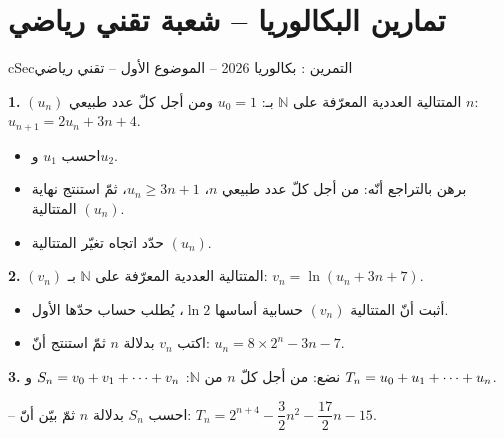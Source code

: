 \documentclass[12pt,a4paper]{article}
\newenvironment{BOX}[2]{\begin{otherlanguage}{english}\begin{arbox}{#1}{#2}}{\end{arbox}\end{otherlanguage}}
\newcounter{exo}
\newenvironment{tamrin}[1]{\stepcounter{exo}\begin{BOX}{cSec}{التمرين \theexo: #1}}{\end{BOX}}
\renewcommand{\cdots}{\mathinner{\cdotp\cdotp\cdotp}}
\newcommand{\N}{\mathbb{N}}
\newenvironment{sq}{\begin{itemize}[leftmargin=2.4em,itemsep=3pt]}{\end{itemize}}
\newcommand{\qa}{\item[(أ)]}\newcommand{\qb}{\item[(ب)]}\newcommand{\qc}{\item[(جـ)]}\newcommand{\qd}{\item[(د)]}\newcommand{\qe}{\item[(هـ)]}
\newcommand{\QQ}[1]{\par\smallskip\textbf{#1.} }
\begin{document}
\section{تمارين البكالوريا -- شعبة تقني رياضي}
\begin{tamrin}{بكالوريا 2026 -- الموضوع الأول -- تقني رياضي}
\QQ{1} $(u_n)$ المتتالية العددية المعرّفة على $\N$ بـ: $u_0=1$ ومن أجل كلّ عدد طبيعي $n$: $u_{n+1}=2u_n+3n+4$.
\begin{sq}
\qa احسب $u_1$ و$u_2$.
\qb برهن بالتراجع أنّه: من أجل كلّ عدد طبيعي $n$، $u_n\geq 3n+1$، ثمّ استنتج نهاية المتتالية $(u_n)$.
\qc حدّد اتجاه تغيّر المتتالية $(u_n)$.
\end{sq}

\QQ{2} $(v_n)$ المتتالية العددية المعرّفة على $\N$ بـ: $v_n=\ln(u_n+3n+7)$.
\begin{sq}
\qa أثبت أنّ المتتالية $(v_n)$ حسابية أساسها $\ln2$، يُطلب حساب حدّها الأول.
\qb اكتب $v_n$ بدلالة $n$ ثمّ استنتج أنّ: $u_n=8\times2^n-3n-7$.
\end{sq}

\QQ{3} نضع: من أجل كلّ $n$ من $\N$: $S_n=v_0+v_1+\cdots+v_n$ و $T_n=u_0+u_1+\cdots+u_n$.

-- احسب $S_n$ بدلالة $n$ ثمّ بيّن أنّ: $T_n=2^{n+4}-\dfrac32 n^2-\dfrac{17}{2}n-15$.
\end{tamrin}
\end{document}
